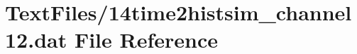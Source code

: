 \hypertarget{14time2histsim__channel12_8dat}{}\section{Text\+Files/14time2histsim\+\_\+channel12.dat File Reference}
\label{14time2histsim__channel12_8dat}
